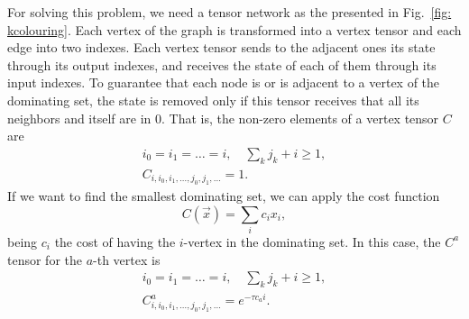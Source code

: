 For solving this problem, we need a tensor network as the presented in Fig.~\ref{fig: kcolouring}. Each vertex of the graph is transformed into a vertex tensor and each edge into two indexes. Each vertex tensor sends to the adjacent ones its state through its output indexes, and receives the state of each of them through its input indexes. To guarantee that each node is or is adjacent to a vertex of the dominating set, the state is removed only if this tensor receives that all its neighbors and itself are in $0$. That is, the non-zero elements of a vertex tensor $C$ are
\begin{equation}
    \begin{gathered}
    i_0 = i_1 = \dots = i,\quad \sum_k j_k + i\geq 1,\\ 
        C_{i,i_0,i_1,\dots, j_0, j_1,\dots} = 1.
    \end{gathered}
\end{equation}
If we want to find the smallest dominating set, we can apply the cost function
\begin{equation}
    C(\vec{x}) = \sum_i c_i x_i,
\end{equation}
being $c_i$ the cost of having the $i$-vertex in the dominating set. In this case, the $C^a$ tensor for the $a$-th vertex is
\begin{equation}
    \begin{gathered}
    i_0 = i_1 = \dots = i,\quad \sum_k j_k + i\geq 1,\\ 
        C^a_{i,i_0,i_1,\dots, j_0, j_1,\dots} = e^{-\tau c_a i}.
    \end{gathered}
\end{equation}





